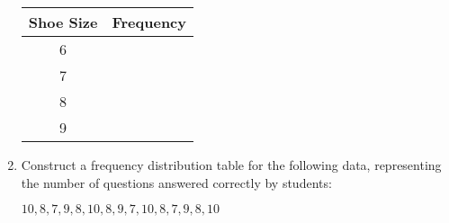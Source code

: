 \begin{enumerate}[noitemsep, label = \color{blue}\arabic*.]
    \begin{center}
    \begin{tabular}{|c|c|}
    \hline
    \textbf{Shoe Size} & \textbf{Frequency} \\
    \hline
    6 & \\
    \hline
    7 & \\
    \hline
    8 & \\
    \hline
    9 & \\
    \hline
    \end{tabular}
    \end{center}

    \item Construct a frequency distribution table for the following data, representing the number of questions answered correctly by students:

     {\centering $  10, 8, 7, 9, 8, 10, 8, 9, 7, 10, 8, 7, 9, 8, 10  $\par}
    
\end{enumerate}
